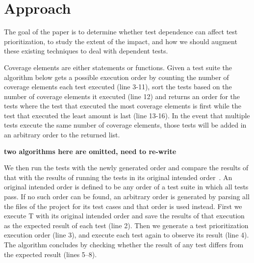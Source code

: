 \section{Approach}
The goal of the paper is to determine whether test dependence can affect test prioritization, to study the extent of the impact, and how we should augment these existing techniques to deal with dependent tests. 

Coverage elements are either statements or functions. Given a test suite the algorithm below gets a possible execution order by counting the number of coverage elements each test executed (line 3-11), sort the tests based on the number of coverage elements it executed (line 12) and returns an order for the tests where the test that executed the most coverage elements is first while the test that executed the least amount is last (line 13-16). In the event that multiple tests execute the same number of coverage elements, those tests will be added in an arbitrary order to the returned list. 

\textbf{two algorithms here are omitted, need to re-write}

We then run the tests with the newly generated order and compare the results of that with the results of running the tests in its original intended order~\cite{}. An original intended order is defined to be any order of a test suite in which all tests pass. If no such order can be found, an arbitrary order is generated by parsing all the files of the project for its test cases and that order is used instead. First we execute T with its original intended order and save the results of that execution as the expected result of each test (line 2). Then we generate a test prioritization execution order (line 3), and execute each test again to observe its result (line 4). The algorithm concludes by checking whether the result of any test differs from the expected result (lines 5--8).

